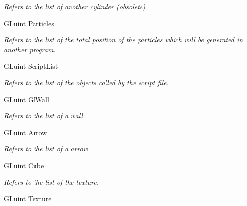 \begin{DoxyCompactItemize}
\begin{DoxyCompactList}\small\item\em \-Refers to the list of another cylinder (obsolete) \end{DoxyCompactList}\item 
\hypertarget{classDraw_a0fd83139e0b18df8d7beb2a83c5ab4d2}{\-G\-Luint \hyperlink{classDraw_a0fd83139e0b18df8d7beb2a83c5ab4d2}{\-Particles}}\label{classDraw_a0fd83139e0b18df8d7beb2a83c5ab4d2}

\begin{DoxyCompactList}\small\item\em \-Refers to the list of the total position of the particles which will be generated in another program. \end{DoxyCompactList}\item 
\hypertarget{classDraw_ac78264a39dc846d3770b82d3dbb5fcab}{\-G\-Luint \hyperlink{classDraw_ac78264a39dc846d3770b82d3dbb5fcab}{\-Script\-List}}\label{classDraw_ac78264a39dc846d3770b82d3dbb5fcab}

\begin{DoxyCompactList}\small\item\em \-Refers to the list of the objects called by the script file. \end{DoxyCompactList}\item 
\hypertarget{classDraw_ab6e9ec77599bfe76cdbe67e70d1b2ce8}{\-G\-Luint \hyperlink{classDraw_ab6e9ec77599bfe76cdbe67e70d1b2ce8}{\-Gl\-Wall}}\label{classDraw_ab6e9ec77599bfe76cdbe67e70d1b2ce8}

\begin{DoxyCompactList}\small\item\em \-Refers to the list of a wall. \end{DoxyCompactList}\item 
\hypertarget{classDraw_ae374e4cd54f633606db3098af179b138}{\-G\-Luint \hyperlink{classDraw_ae374e4cd54f633606db3098af179b138}{\-Arrow}}\label{classDraw_ae374e4cd54f633606db3098af179b138}

\begin{DoxyCompactList}\small\item\em \-Refers to the list of a arrow. \end{DoxyCompactList}\item 
\hypertarget{classDraw_a79fa212e7dfcc2876d337a3635ecdc6f}{\-G\-Luint \hyperlink{classDraw_a79fa212e7dfcc2876d337a3635ecdc6f}{\-Cube}}\label{classDraw_a79fa212e7dfcc2876d337a3635ecdc6f}

\begin{DoxyCompactList}\small\item\em \-Refers to the list of the texture. \end{DoxyCompactList}\item 
\hypertarget{classDraw_a29bc3cc5d24dd4366272171786690ab7}{\-G\-Luint \hyperlink{classDraw_a29bc3cc5d24dd4366272171786690ab7}{\-Texture}}\label{classDraw_a29bc3cc5d24dd4366272171786690ab7}


\end{DoxyCompactItemize}
